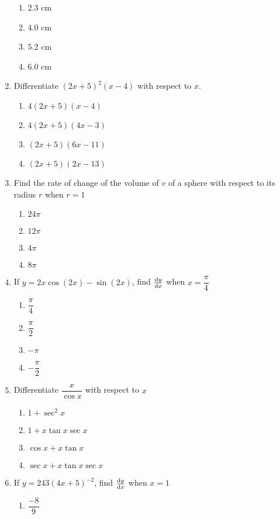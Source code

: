 \begin{multicols}{2}
\begin{enumerate}[label={\arabic*.}]
	\begin{enumerate}[label={\Alph*.}]
	\item \(2.3\) cm
	\item \(4.0\) cm
	\item \(5.2\) cm
	\item \(6.0\) cm
	\end{enumerate}
\item Differentiate \((2x+5)^{2}(x-4)\) with respect to \(x\).
	\begin{enumerate}[label={\Alph*.}]
	\item \(4(2x+5)(x-4)\)
	\item \(4(2x+5)(4x-3)\)
	\item \((2x+5)(6x-11)\)
	\item \((2x+5)(2x-13)\)
	\end{enumerate}
\item Find the rate of change of the volume of \(v\) of a sphere with respect to its radius \(r\) when \(r = 1\)
	\begin{enumerate}[label={\Alph*.}]
	\item \(24\pi\)
	\item \(12\pi\)
	\item \(4\pi\)
	\item \(8\pi\)
	\end{enumerate}
\item If \(y = 2x\cos{(2x)}-\sin{(2x)}\), find \(\dv{y}{x}\) when \(x=\dfrac{\pi}{4}\)
	\begin{enumerate}[label={\Alph*.}]
	\item \(\dfrac{\pi}{4}\)
	\item \(\dfrac{\pi}{2}\)
	\item \(-\pi\)
	\item \(-{\dfrac{\pi}{2}}\)
	\end{enumerate}
\item Differentiate \(\dfrac{x}{\cos x}\) with respect to \(x\)
	\begin{enumerate}[label={\Alph*.}]
	\item \(1 + \sec^{2}x\)
	\item \(1 + x\tan x\sec x\)
	\item \(\cos x + x\tan x \)
	\item \(\sec x + x\tan x \sec x\)
	\end{enumerate}
\item If \(y=243{(4x+5)}^{-2}\), find \(\dv{y}{x}\) when \(x=1\)
	\begin{enumerate}[label={\Alph*.}]
	\item \(\dfrac{-8}{9}\)

\end{enumerate}
\end{enumerate}
\end{multicols}
